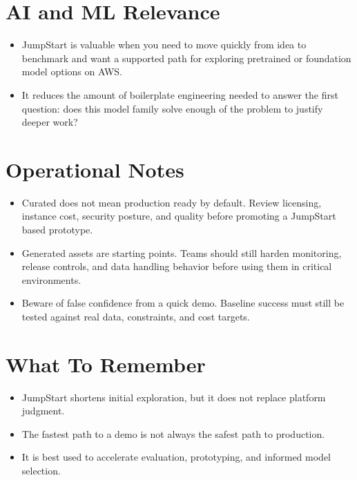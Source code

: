 \documentclass[10pt,twocolumn]{article}
\begin{document}
\section*{AI and ML Relevance}
\begin{itemize}
\item JumpStart is valuable when you need to move quickly from idea to benchmark and want a supported path for exploring pretrained or foundation model options on AWS.
\item It reduces the amount of boilerplate engineering needed to answer the first question: does this model family solve enough of the problem to justify deeper work?
\end{itemize}

\section*{Operational Notes}
\begin{itemize}
\item Curated does not mean production ready by default. Review licensing, instance cost, security posture, and quality before promoting a JumpStart based prototype.
\item Generated assets are starting points. Teams should still harden monitoring, release controls, and data handling behavior before using them in critical environments.
\item Beware of false confidence from a quick demo. Baseline success must still be tested against real data, constraints, and cost targets.
\end{itemize}

\section*{What To Remember}
\begin{itemize}
\item JumpStart shortens initial exploration, but it does not replace platform judgment.
\item The fastest path to a demo is not always the safest path to production.
\item It is best used to accelerate evaluation, prototyping, and informed model selection.
\end{itemize}
\end{document}
